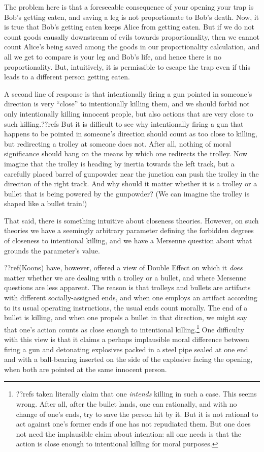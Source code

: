 The problem here is that a foreseeable consequence of your opening your trap is Bob's getting eaten, and saving a leg is not
proportionate to Bob's death. Now, it is true that Bob's getting eaten keeps Alice from getting eaten. But if we do not count
goods causally downstream of evils towards proportionality, then we cannot count Alice's being saved among the goods in 
our proportionality calculation, and all we get to compare is your leg and Bob's life, and hence there is no proportionality.
But, intuitively, it is permissible to escape the trap even if this leads to a different person getting eaten.

A second line of response is that intentionally firing a gun pointed in someone's direction is very ``close'' to intentionally
killing them, and we should forbid not only intentionally killing innocent people, but also actions that are very close to such
killing.??refs But it is difficult to see why intentionally firing a gun that happens to be pointed in someone's direction should 
count as too close to killing, but redirecting a trolley at someone does not. After all, nothing of moral significance should
hang on the means by which one redirects the trolley. Now imagine that the trolley is heading by inertia towards the left 
track, but a carefully placed barrel of gunpowder near the junction can push the trolley in the direciton of the right track.
And why should it matter whether it is a trolley or a bullet that is being powered by the gunpowder? (We can imagine the
trolley is shaped like a bullet train!) 

That said, there is something intuitive about closeness theories. However, on such theories we have a seemingly arbitrary 
parameter defining the forbidden degrees of closeness to intentional killing, and we have a Mersenne question about what
grounds the parameter's value.

??ref(Koons) have, however, offered a view of Double Effect on which it \textit{does} matter whether we are dealing with 
a trolley or a bullet, and where Mersenne questions are less apparent. The reason is that trolleys and bullets are artifacts with different socially-assigned ends, and when 
one employs an artifact according to its usual operating instructions, the usual ends count morally. The end of a bullet is
killing, and when one propels a bullet in that direction, we might say that one's action counts as close enough to intentional 
killing.\footnote{??refs taken literally claim that one \textit{intends} killing in such a case. This seems wrong. After all,
after the bullet lands, one can rationally, and with no change of one's ends, try to save the person hit by it. 
But it is not rational to act against one's former ends if one has not repudiated them. But one does not need the implausible
claim about intention: all one needs is that the action is close enough to intentional killing for moral purposes.} One
difficulty with this view is that it claims a perhaps implausible moral difference between firing a gun and detonating explosives 
packed in a steel pipe sealed at one end and with a ball-bearing inserted on the side of the explosive facing the opening,
when both are pointed at the same innocent person.  

